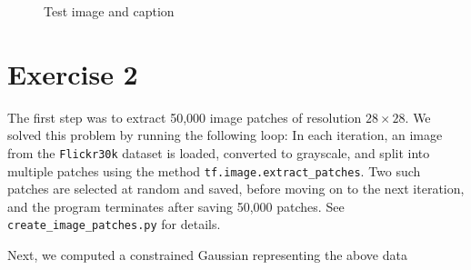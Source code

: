 \documentclass[a4paper]{article}
\theoremstyle{definition}
\theoremstyle{plain}
\begin{document}
\begin{figure}[H]
\centering
{}
\caption{Test image and caption}
\end{figure}






\section*{\center Exercise 2}

The first step was to extract 50,000 image patches of resolution $28\times 28$. We solved this problem by running the following loop: In each iteration, an image from the \texttt{Flickr30k} dataset is loaded, converted to grayscale, and split into multiple patches using the method \texttt{tf.image.extract\_patches}. Two such patches are selected at random and saved, before moving on to the next iteration, and the program terminates after saving 50,000 patches. See \texttt{create\_image\_patches.py} for details.

Next, we computed a constrained Gaussian representing the above data \lipsum[2]
\end{document}
